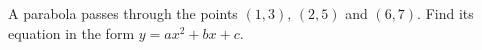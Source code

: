 A parabola passes through the points $(1,3)$, $(2,5)$ and $(6,7)$. Find its equation in the form $y=ax^2+bx+c$.

